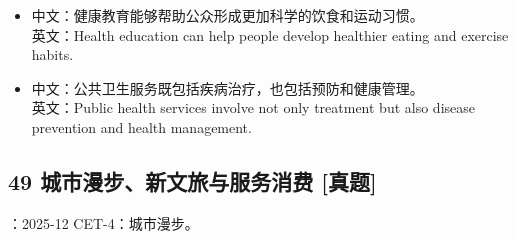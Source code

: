 \documentclass[a4paper,11pt,UTF8,fontset=none]{ctexart}
\begin{document}
\par

\begin{itemize}[leftmargin=1.7em,itemsep=1pt,parsep=0pt,topsep=2pt]
\item \noindent 中文：健康教育能够帮助公众形成更加科学的饮食和运动习惯。\\ 英文：Health education can help people develop healthier eating and exercise habits.\par


\item \noindent 中文：公共卫生服务既包括疾病治疗，也包括预防和健康管理。\\ 英文：Public health services involve not only treatment but also disease prevention and health management.\par


\end{itemize}

\subsection{49 城市漫步、新文旅与服务消费 {\color{AccentBlue} [真题]}}

\begin{tcolorbox}[enhanced,breakable,boxrule=0.35pt,colback=VeryPaleBlue,colframe=AccentBlue!40,left=7pt,right=7pt,top=4pt,bottom=4pt,borderline west={2pt}{0pt}{AccentBlue},before skip=4pt,after skip=6pt]
：2025-12 CET-4：城市漫步。\par


\end{tcolorbox}
\end{document}
